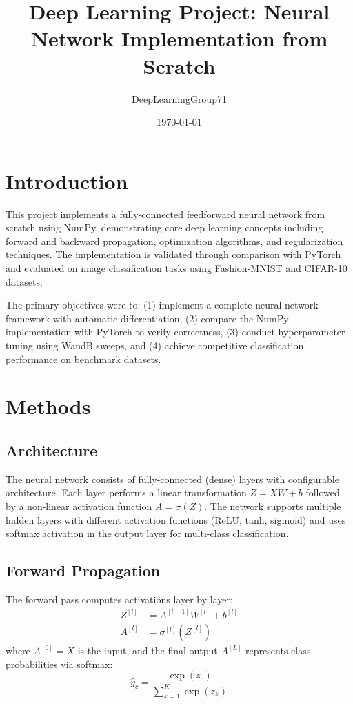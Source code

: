 \documentclass[11pt,a4paper]{article}
\title{Deep Learning Project: Neural Network Implementation from Scratch}
\author{DeepLearningGroup71}
\date{\today}
\begin{document}
\maketitle

\section{Introduction}

This project implements a fully-connected feedforward neural network from scratch using NumPy, demonstrating core deep learning concepts including forward and backward propagation, optimization algorithms, and regularization techniques. The implementation is validated through comparison with PyTorch and evaluated on image classification tasks using Fashion-MNIST and CIFAR-10 datasets.

The primary objectives were to: (1) implement a complete neural network framework with automatic differentiation, (2) compare the NumPy implementation with PyTorch to verify correctness, (3) conduct hyperparameter tuning using WandB sweeps, and (4) achieve competitive classification performance on benchmark datasets.

\section{Methods}

\subsection{Architecture}

The neural network consists of fully-connected (dense) layers with configurable architecture. Each layer performs a linear transformation $Z = XW + b$ followed by a non-linear activation function $A = \sigma(Z)$. The network supports multiple hidden layers with different activation functions (ReLU, tanh, sigmoid) and uses softmax activation in the output layer for multi-class classification.

\subsection{Forward Propagation}

The forward pass computes activations layer by layer:
\begin{align}
Z^{[l]} &= A^{[l-1]}W^{[l]} + b^{[l]} \\
A^{[l]} &= \sigma^{[l]}(Z^{[l]})
\end{align}
where $A^{[0]} = X$ is the input, and the final output $A^{[L]}$ represents class probabilities via softmax:
\begin{equation}
\hat{y}_c = \frac{\exp(z_c)}{\sum_{k=1}^{K} \exp(z_k)}
\end{equation}
\end{document}
